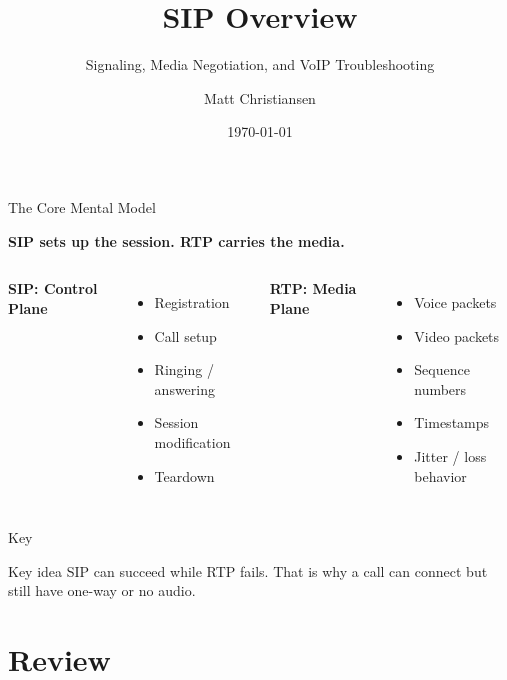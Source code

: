 \documentclass[aspectratio=169]{beamer}
\title{SIP Overview}
\subtitle{Signaling, Media Negotiation, and VoIP Troubleshooting}
\author{Matt Christiansen}
\date{\today}
\begin{document}
\begin{frame}
  \titlepage
\end{frame}

\begin{frame}{The Core Mental Model}
  \Large
  \begin{center}
    \textbf{SIP sets up the session. RTP carries the media.}
  \end{center}

  \vspace{0.4cm}

  \begin{columns}[T]
      \textbf{SIP: Control Plane}
      \begin{itemize}
        \item Registration
        \item Call setup
        \item Ringing / answering
        \item Session modification
        \item Teardown
      \end{itemize}

      \textbf{RTP: Media Plane}
      \begin{itemize}
        \item Voice packets
        \item Video packets
        \item Sequence numbers
        \item Timestamps
        \item Jitter / loss behavior
      \end{itemize}
  \end{columns}
\end{frame}


\begin{frame}{Key}
  \vspace{0.25cm}
  \begin{block}{Key idea}
    SIP can succeed while RTP fails. That is why a call can connect but still have one-way or no audio.
  \end{block}
\end{frame}





\section{Review}
\end{document}
